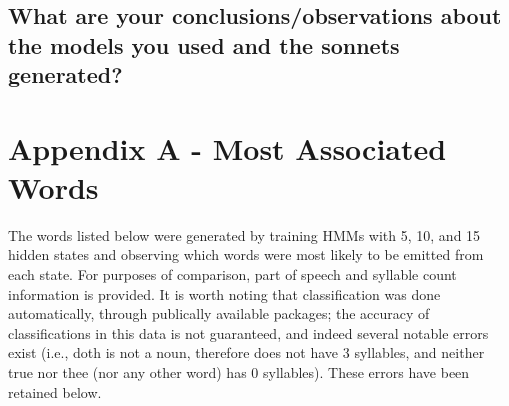 \subsection{What are your conclusions/observations about the models you used and the sonnets generated?}

\pagebreak
\section{Appendix A - Most Associated Words}
The words listed below were generated by training HMMs with 5, 10, and 15 hidden states and observing which words were most likely to be emitted from each state. For purposes of comparison, part of speech and syllable count information is provided. It is worth noting that classification was done automatically, through publically available packages; the accuracy of classifications in this data is not guaranteed, and indeed several notable errors exist (i.e., doth is not a noun, therefore does not have 3 syllables, and neither true nor thee (nor any other word) has 0 syllables). These errors have been retained below.


